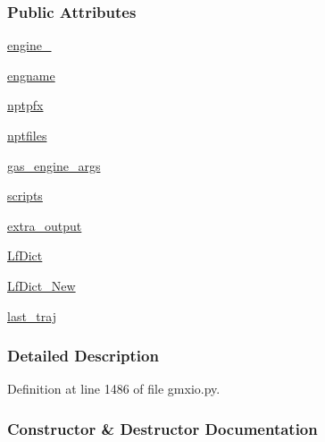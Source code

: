 \subsubsection*{Public Attributes}
\begin{DoxyCompactItemize}
\item 
\hyperlink{classsrc_1_1gmxio_1_1Liquid__GMX_a1cbe67a56ad39724258c676bbd6356c3}{engine\+\_\+}
\item 
\hyperlink{classsrc_1_1gmxio_1_1Liquid__GMX_a444456faf74a1baf0856e2c0f4264402}{engname}
\item 
\hyperlink{classsrc_1_1gmxio_1_1Liquid__GMX_a4a131ebce7647214ac0f8f2baa95c0a0}{nptpfx}
\item 
\hyperlink{classsrc_1_1gmxio_1_1Liquid__GMX_ae1df170efb8aeb3ea349fa38dab925e7}{nptfiles}
\item 
\hyperlink{classsrc_1_1gmxio_1_1Liquid__GMX_ac23d80eefaac24b5f377b571187a71aa}{gas\+\_\+engine\+\_\+args}
\item 
\hyperlink{classsrc_1_1gmxio_1_1Liquid__GMX_a523c30b145ad222c848689f58ae91fbc}{scripts}
\item 
\hyperlink{classsrc_1_1gmxio_1_1Liquid__GMX_ae2c5b9cedff2c2bf5bebfde37540e230}{extra\+\_\+output}
\item 
\hyperlink{classsrc_1_1gmxio_1_1Liquid__GMX_ac36a03de2beaec5becea5b62d6cf999b}{Lf\+Dict}
\item 
\hyperlink{classsrc_1_1gmxio_1_1Liquid__GMX_a436473ef3c98e06553189e4bf8641aa3}{Lf\+Dict\+\_\+\+New}
\item 
\hyperlink{classsrc_1_1gmxio_1_1Liquid__GMX_a53db5f9c64c022cf9c789b4b980e1c80}{last\+\_\+traj}
\end{DoxyCompactItemize}


\subsubsection{Detailed Description}


Definition at line 1486 of file gmxio.\+py.



\subsubsection{Constructor \& Destructor Documentation}
\mbox{\label{classsrc_1_1gmxio_1_1Liquid__GMX_a4084ac631cf4924a9ff202a5ee6c501e}} 
